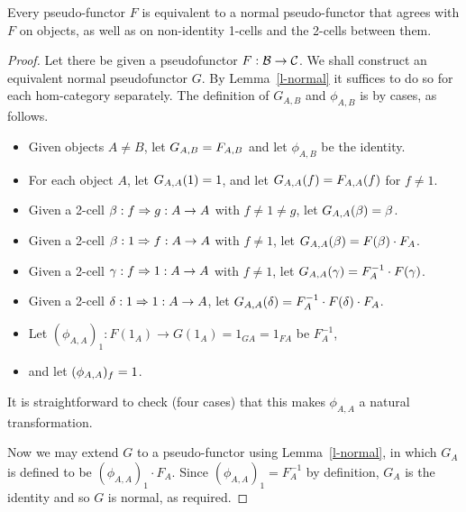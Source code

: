\begin{propn}\label{prop-normal}
	Every pseudo-functor $F$ is equivalent to a normal pseudo-functor
	that agrees with $F$ on objects, as well as on non-identity 1-cells and
	the 2-cells between them.
\end{propn}
\begin{proof}
	Let there be given a pseudofunctor $F:\mathcal{B}\to\mathcal{C}$. We shall
	construct an equivalent normal pseudofunctor $G$. By Lemma~\ref{l-normal}
	it suffices to do so for each hom-category separately. The definition
	of $G_{A,B}$ and $\phi_{A,B}$ is by cases, as follows.
	\begin{itemize}
		\item Given objects $A\neq B$, let $G_{A,B} = F_{A,B}$
			and let $\phi_{A,B}$ be the identity.
		\item For each object $A$, let $G_{A,A}(1) = 1$, and let
			$G_{A,A}(f) = F_{A,A}(f)$ for $f \neq 1$.
		\item Given a 2-cell $\beta:f\Rightarrow g: A\to A$ with $f\neq1\neq g$,
			let $G_{A,A}(\beta) = \beta$.
		\item Given a 2-cell $\beta:1\Rightarrow f: A\to A$ with $f\neq 1$,
			let $G_{A,A}(\beta) = F(\beta)\cdot F_A$.
		\item Given a 2-cell $\gamma:f\Rightarrow 1: A\to A$ with $f\neq 1$,
			let $G_{A,A}(\gamma) = F_A^{-1}\cdot F(\gamma)$.
		\item Given a 2-cell $\delta: 1\Rightarrow 1: A\to A$,
			let $G_{A,A}(\delta) = F_A^{-1}\cdot F(\delta)\cdot F_A$.
		\item Let $(\phi_{A,A})_1: F(1_A)\to G(1_A) = 1_{GA} = 1_{FA}$ be $F_A^{-1}$,
		\item and let $(\phi_{A,A})_f = 1$.
	\end{itemize}
	It is straightforward to check (four cases) that this
	makes $\phi_{A,A}$ a natural transformation.
	
	Now we may extend $G$ to a pseudo-functor using Lemma~\ref{l-normal},
	in which $G_A$ is defined to be $(\phi_{A,A})_1\cdot F_A$. Since
	$(\phi_{A,A})_1 = F_A^{-1}$ by definition, $G_A$ is the identity and
	so $G$ is normal, as required.
\end{proof}


